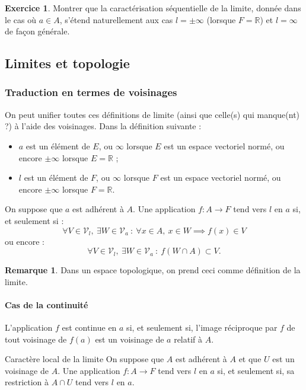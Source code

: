 \documentclass[french]{article}
\newcommand{\R}{\mathbb{R}}
\theoremstyle{plain}
\theoremstyle{definition}
\newtheorem{exo}{Exercice}
\newtheorem*{rmq}{Remarque}
\theoremstyle{remark}
\begin{document}
\begin{exo}
	Montrer que la caractérisation séquentielle de la limite, donnée dans le cas où $a\in A$, s'étend naturellement aux cas $l=\pm\infty$ (lorsque $F=\R$) et $l=\infty$ de façon générale.
\end{exo}

\subsection{Limites et topologie}

\subsubsection*{Traduction en termes de voisinages}

On peut unifier toutes ces définitions de limite (ainsi que celle(s) qui manque(nt) ?) à l'aide des voisinages. Dans la définition suivante :
\begin{itemize}
	\item $a$ est un élément de $E$, ou $\infty$ lorsque $E$ est un espace vectoriel normé, ou encore $\pm\infty$ lorsque $E=\R$ ;
	\item $l$ est un élément de $F$, ou $\infty$ lorsque $F$ est un espace vectoriel normé, ou encore $\pm\infty$ lorsque $F=\R$.
\end{itemize}

\begin{thm}{}%
	On suppose que $a$ est adhérent à $A$. Une application $f:A\to F$ tend vers $l$ en $a$ si, et seulement si : $$\forall V\in\mathcal{V}_l,\ \exists W\in\mathcal{V}_a\ : \ \forall x\in A,\ x\in W\implies f(x)\in V$$ ou encore :
	$$\forall V\in\mathcal{V}_l,\ \exists W\in\mathcal{V}_a\ :\ f(W\cap A)\subset V.$$
\end{thm}

\begin{rmq}
	Dans un espace topologique, on prend ceci comme définition de la limite.
\end{rmq}

\paragraph{Cas de la continuité} L'application $f$ est continue en $a$ si, et seulement si, l'image réciproque par $f$ de tout voisinage de $f(a)$ est un voisinage de $a$ relatif à $A$.

\begin{thm}{Caractère local de la limite}%
	On suppose que $A$ est adhérent à $A$ et que $U$ est un voisinage de $A$. Une application $f:A\to F$ tend vers $l$ en $a$ si, et seulement si, sa restriction à $A\cap U$ tend vers $l$ en $a$.
\end{thm}
\end{document}

